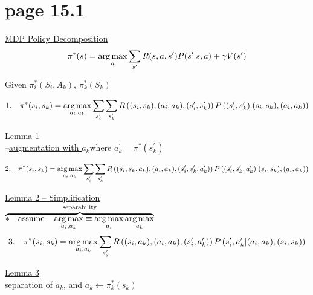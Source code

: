\section*{page 15.1}

\underline{MDP Policy Decomposition}\\

\begin{equation*}
\pi^\ast(s) = \operatorname*{arg\,max}_{a} \sum_{s^\prime} R(s,a,s^\prime) P(s^\prime |s, a) + \gamma V(s^\prime)
\end{equation*}

Given $\pi^\ast_i(S_i, A_k)$, $\pi^\ast_k(S_k)$

\begin{equation*}
1.\quad \pi^\ast(s_i,s_k) = \operatorname*{arg\,max}_{a_i, a_k} \sum_{s^\prime_i} \sum_{s^\prime_k} R\left( (s_i,s_k),(a_i,a_k),(s^\prime_i,s^\prime_k)\right) P\left( (s^\prime_i, s^\prime_k) \middle| (s_i, s_k), (a_i, a_k)  \right)
\end{equation*}

\textasteriskcentered \quad \underline{Lemma 1}\\

--\underline{augmentation with $a_k$}\quad where $a^\prime_k=\pi^\ast(s^\prime_k)$

\begin{equation*}
2.\quad\pi^\ast(s_i, s_k) = \operatorname*{arg\,max}_{a_i, a_k} \sum_{s^\prime_i} \sum_{s^\prime_k} R\left((s_i, s_k, a_k), (a_i,a_k),(s^\prime_i,s^\prime_k,a^\prime_k) \right) P\left( (s^\prime_i, s^\prime_k, a^\prime_k) \middle| (s_i, s_k), (a_i,a_k) \right) 
\end{equation*}

\textasteriskcentered \quad \underline{Lemma 2 -- Simplification}\\

$\overbrace{\ast\quad\text{assume} \quad \operatorname*{arg\,max}_{a_i,a_k} \equiv \operatorname*{arg\,max}_{a_i} \operatorname*{arg\,max}_{a_k}}^{\text{separability}}$\\

 \begin{equation*}
3.\quad\pi^\ast(s_i, s_k) = \operatorname*{arg\,max}_{a_i, a_k} \sum_{s^\prime_i}  R\left((s_i, a_k), (a_i,a_k),(s^\prime_i, a^\prime_k) \right) P\left( s^\prime_i, a^\prime_k \middle| (a_i,a_k),  (s_i, s_k) \right) 
\end{equation*}

\underline{Lemma 3}\\

\textasteriskcentered \quad separation of $a_k$, and $a_k \leftarrow \pi^{\ast}_k(s_k)$

